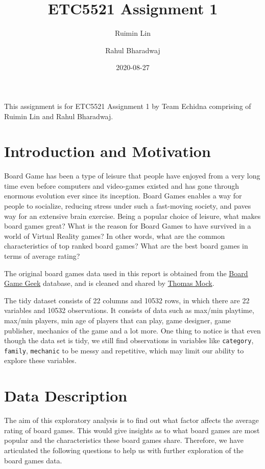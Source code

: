 \documentclass[
]{article}
\title{ETC5521 Assignment 1}
\author{Ruimin Lin \and Rahul Bharadwaj}
\date{2020-08-27}
\begin{document}
\maketitle

{
\setcounter{tocdepth}{2}
\tableofcontents
}
{This assignment is for ETC5521 Assignment 1 by Team Echidna comprising of Ruimin Lin and Rahul Bharadwaj.}

\hypertarget{introduction-and-motivation}{%
\section{Introduction and Motivation}\label{introduction-and-motivation}}

Board Game has been a type of leisure that people have enjoyed from a very long time even before computers and video-games existed and has gone through enormous evolution ever since its inception. Board Games enables a way for people to socialize, reducing stress under such a fast-moving society, and paves way for an extensive brain exercise. Being a popular choice of leisure, what makes board games great? What is the reason for Board Games to have survived in a world of Virtual Reality games? In other words, what are the common characteristics of top ranked board games? What are the best board games in terms of average rating?

The original board games data used in this report is obtained from the \href{https://boardgamegeek.com/}{Board Game Geek} database, and is cleaned and shared by \href{https://github.com/rfordatascience/tidytuesday/tree/master/data/2019/2019-03-12}{Thomas Mock}.

The tidy dataset consists of 22 columns and 10532 rows, in which there are 22 variables and 10532 observations. It consists of data such as max/min playtime, max/min players, min age of players that can play, game designer, game publisher, mechanics of the game and a lot more. One thing to notice is that even though the data set is tidy, we still find observations in variables like \texttt{category}, \texttt{family}, \texttt{mechanic} to be messy and repetitive, which may limit our ability to explore these variables.

\hypertarget{data-description}{%
\section{Data Description}\label{data-description}}

The aim of this exploratory analysis is to find out what factor affects the average rating of board games. This would give insights as to what board games are most popular and the characteristics these board games share. Therefore, we have articulated the following questions to help us with further exploration of the board games data.
\end{document}

